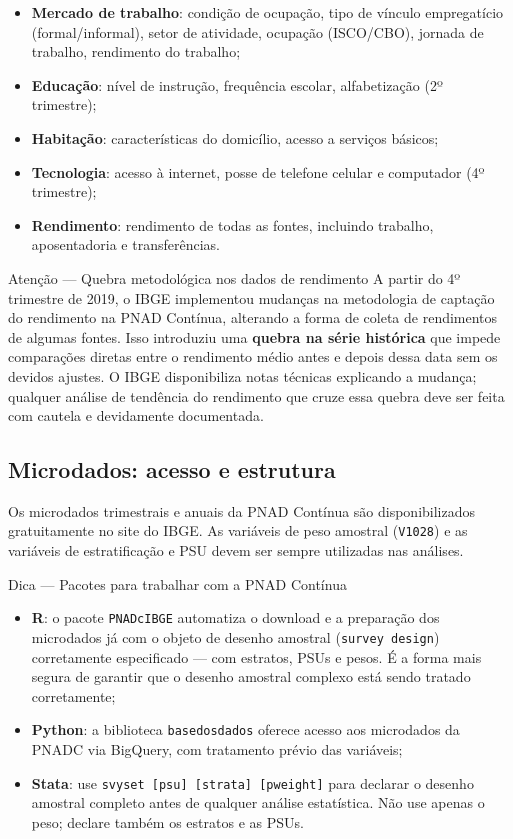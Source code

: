 \begin{itemize}
  \item \textbf{Mercado de trabalho}: condição de ocupação, tipo de vínculo empregatício (formal/informal), setor de atividade, ocupação (ISCO/CBO), jornada de trabalho, rendimento do trabalho;
  \item \textbf{Educação}: nível de instrução, frequência escolar, alfabetização (2º trimestre);
  \item \textbf{Habitação}: características do domicílio, acesso a serviços básicos;
  \item \textbf{Tecnologia}: acesso à internet, posse de telefone celular e computador (4º trimestre);
  \item \textbf{Rendimento}: rendimento de todas as fontes, incluindo trabalho, aposentadoria e transferências.
\end{itemize}

\begin{boxatencao}{Atenção --- Quebra metodológica nos dados de rendimento}
A partir do 4º trimestre de 2019, o IBGE implementou mudanças na metodologia de captação do rendimento na PNAD Contínua, alterando a forma de coleta de rendimentos de algumas fontes. Isso introduziu uma \textbf{quebra na série histórica} que impede comparações diretas entre o rendimento médio antes e depois dessa data sem os devidos ajustes. O IBGE disponibiliza notas técnicas explicando a mudança; qualquer análise de tendência do rendimento que cruze essa quebra deve ser feita com cautela e devidamente documentada.
\end{boxatencao}

\subsection{Microdados: acesso e estrutura}

Os microdados trimestrais e anuais da PNAD Contínua são disponibilizados gratuitamente no site do IBGE. As variáveis de peso amostral (\texttt{V1028}) e as variáveis de estratificação e PSU devem ser sempre utilizadas nas análises.

\begin{boxdica}{Dica --- Pacotes para trabalhar com a PNAD Contínua}
\begin{itemize}
  \item \textbf{R}: o pacote \texttt{PNADcIBGE} automatiza o download e a preparação dos microdados já com o objeto de desenho amostral (\texttt{survey design}) corretamente especificado --- com estratos, PSUs e pesos. É a forma mais segura de garantir que o desenho amostral complexo está sendo tratado corretamente;
  \item \textbf{Python}: a biblioteca \texttt{basedosdados} oferece acesso aos microdados da PNADC via BigQuery, com tratamento prévio das variáveis;
  \item \textbf{Stata}: use \texttt{svyset [psu] [strata] [pweight]} para declarar o desenho amostral completo antes de qualquer análise estatística. Não use apenas o peso; declare também os estratos e as PSUs.
\end{itemize}
\end{boxdica}

